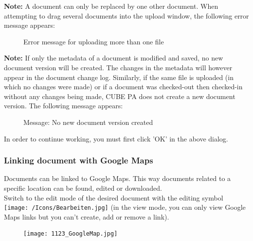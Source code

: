 \textbf{Note:} A document can only be replaced by one other document. When attempting to drag several documents into the upload window, the following error message appears:

\begin{figure}[H]
\caption{Error message for uploading more than one file}
\end{figure}

\textbf{Note:} If only the metadata of a document is modified and saved, no new document version will be created. The changes in the metadata will however appear in the document change log. Similarly, if the same file is uploaded (in which no changes were made) or if a document was checked-out then checked-in without any changes being made, CUBE PA does not create a new document version. The following message appears:

\begin{figure}[H]
\caption{Message: No new document version created}
\end{figure}

In order to continue working, you must first click 'OK' in the above dialog.

\subsubsection{Linking document with Google Maps}
\label{bkm:Ref442545553}
Documents can be linked to Google Maps. This way documents related to a specific location can be found, edited or downloaded. \\
Switch to the edit mode of the desired document with the editing symbol \texttt{[image: /Icons/Bearbeiten.jpg]} (in the view mode, you can only view Google Maps links but you can't create, add or remove a link).

\vspace{\baselineskip}

\begin{figure}
\vspace{-15pt}
\texttt{[image: 1123\_GoogleMap.jpg]}
\end{figure}

